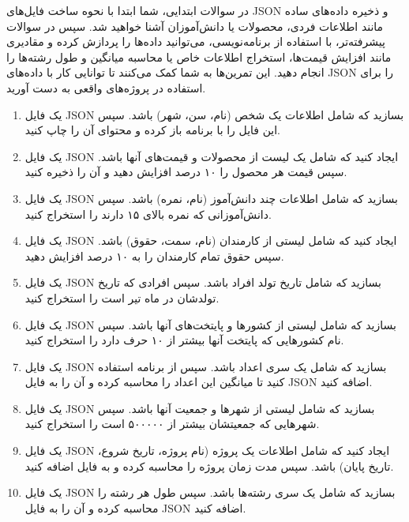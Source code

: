 \documentclass[b5paper,12pt]{article}
\begin{document}
	در سوالات ابتدایی، شما ابتدا با نحوه ساخت فایل‌های JSON و ذخیره داده‌های ساده مانند اطلاعات فردی، محصولات یا دانش‌آموزان آشنا خواهید شد. سپس در سوالات پیشرفته‌تر، با استفاده از برنامه‌نویسی، می‌توانید داده‌ها را پردازش کرده و مقادیری مانند افزایش قیمت‌ها، استخراج اطلاعات خاص یا محاسبه میانگین و طول رشته‌ها را انجام دهید. این تمرین‌ها به شما کمک می‌کنند تا توانایی کار با داده‌های JSON را برای استفاده در پروژه‌های واقعی به دست آورید.
	
	\begin{enumerate}
		\item یک فایل JSON بسازید که شامل اطلاعات یک شخص (نام، سن، شهر) باشد. سپس این فایل را با برنامه باز کرده و محتوای آن را چاپ کنید.
		\item یک فایل JSON ایجاد کنید که شامل یک لیست از محصولات و قیمت‌های آنها باشد. سپس قیمت هر محصول را ۱۰ درصد افزایش دهید و آن را ذخیره کنید.
		\item یک فایل JSON بسازید که شامل اطلاعات چند دانش‌آموز (نام، نمره) باشد. سپس دانش‌آموزانی که نمره بالای ۱۵ دارند را استخراج کنید.
		\item یک فایل JSON ایجاد کنید که شامل لیستی از کارمندان (نام، سمت، حقوق) باشد. سپس حقوق تمام کارمندان را به ۱۰ درصد افزایش دهید.
		\item یک فایل JSON بسازید که شامل تاریخ تولد افراد باشد. سپس افرادی که تاریخ تولدشان در ماه تیر است را استخراج کنید.
		\item یک فایل JSON بسازید که شامل لیستی از کشورها و پایتخت‌های آنها باشد. سپس نام کشورهایی که پایتخت آنها بیشتر از ۱۰ حرف دارد را استخراج کنید.
		\item یک فایل JSON بسازید که شامل یک سری اعداد باشد. سپس از برنامه استفاده کنید تا میانگین این اعداد را محاسبه کرده و آن را به فایل JSON اضافه کنید.
		\item یک فایل JSON بسازید که شامل لیستی از شهرها و جمعیت آنها باشد. سپس شهرهایی که جمعیتشان بیشتر از ۵۰۰۰۰۰ است را استخراج کنید.
		\item یک فایل JSON ایجاد کنید که شامل اطلاعات یک پروژه (نام پروژه، تاریخ شروع، تاریخ پایان) باشد. سپس مدت زمان پروژه را محاسبه کرده و به فایل اضافه کنید.
		\item یک فایل JSON بسازید که شامل یک سری رشته‌ها باشد. سپس طول هر رشته را محاسبه کرده و آن را به فایل JSON اضافه کنید.
	\end{enumerate}
	
	
\end{document}
